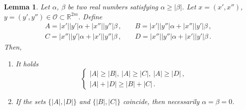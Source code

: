 \documentclass[12pt,reqno]{amsart}
\newtheorem{lemma}[theorem]{Lemma}
\theoremstyle{definition}
\theoremstyle{remark}
\newcommand{\con}[1]{\mathbb{#1}}
\newcommand{\R}{\con{R}} %
\newcommand{\ocal}{\mathcal{O}}
\numberwithin{equation}{section}
\begin{document}
\begin{lemma}
	\label{Lemma:ComputationABCD} Let $\alpha$, $\beta$ be two real numbers satisfying $\alpha \geq
	|\beta|$. Let $x=(x',x'')$, $y=(y',y'')\in \ocal \subset \R^{2m}$. Define
	$$
	\begin{array}{cc}
	A = |x'||y'|  \alpha + |x''||y''|\beta \,, \ \ \ \ \ &
	B = |x'||y''| \alpha + |x''||y'| \beta \,, \\
	C = |x''||y'| \alpha + |x'||y''| \beta \,, \ \ \ \ \ &
	D = |x''||y''|\alpha + |x'||y'|  \beta \,.
	\end{array}
	$$
	Then,
	\begin{enumerate}
		\item It holds
		$$
		\begin{cases}
		|A| \geq |B|,\ |A| \geq|C|, \ |A| \geq|D|\,, \\
		|A| + |D| \geq |B| + |C|\,.
		\end{cases}
		$$
		\item If  the sets $\{|A|,|D|\}$ and $\{|B|,|C|\}$ coincide, then necessarily $\alpha = \beta = 0$.
	\end{enumerate}
	
\end{lemma}
\end{document}
